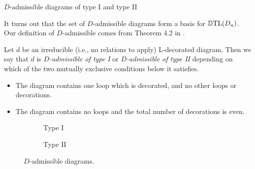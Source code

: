 \begin{section}{$D$-admissible diagrams of type I and type II}\label{sec:admissible}

It turns out that the set of $D$-admissible diagrams form a basis for $\operatorname{\mathbb{D}TL}(D_n)$.  Our definition of $D$-admissible comes from Theorem 4.2 in \cite{Green1998}.

\begin{definition}\label{def:admissible}
\rm Let $d$ be an irreducible (i.e., no relations to apply) L-decorated diagram.  Then we say that $d$ is \emph{$D$-admissible of type I} or \emph{$D$-admissible of type II} depending on which of the two mutually exclusive conditions below it satisfies. 

\begin{itemize}

\item[(I)] \label{type1} The diagram contains one loop which is decorated, and no other loops or decorations.
\item[(II)] \label{type2} The diagram contains no loops and the total number of decorations is even.

\end{itemize}
\end{definition}

\begin{figure}[!ht]
\centering
\begin{subfigure}[b]{0.4\textwidth}
\caption{Type I}
\label{fig:type1diag}
\end{subfigure}
\quad
\begin{subfigure}[b]{0.4\textwidth}
\caption{Type II}
\label{fig:type2diag}
\end{subfigure}
\caption{$D$-admissible diagrams.}
\label{fig:diag}
\end{figure}



\end{section}
